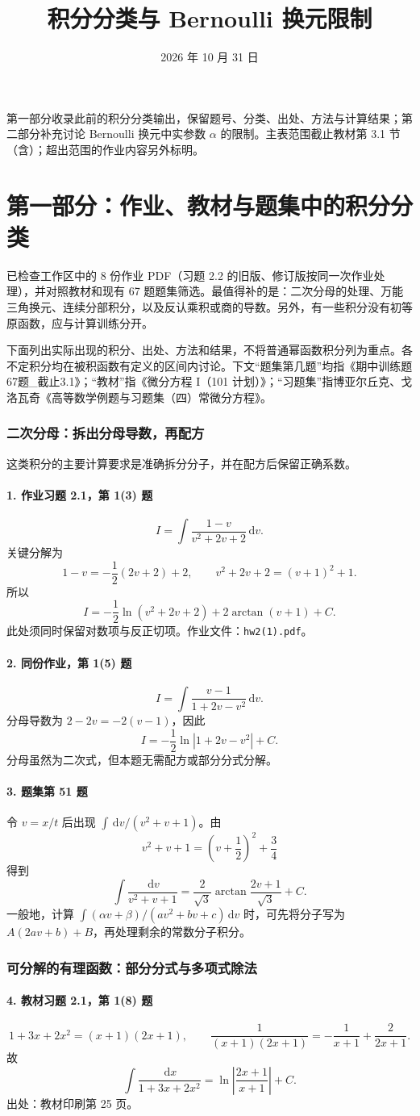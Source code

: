 \documentclass[11pt,a4paper]{ctexart}
\newcommand{\dd}{\,\mathrm d}
\newcommand{\entry}[1]{\subsection*{#1}}
\begin{document}
\title{积分分类与 Bernoulli 换元限制}
\author{}\date{2026 年 10 月 31 日}
\maketitle
第一部分收录此前的积分分类输出，保留题号、分类、出处、方法与计算结果；第二部分补充讨论 Bernoulli 换元中实参数 $\alpha$ 的限制。主表范围截止教材第 3.1 节（含）；超出范围的作业内容另外标明。

\part*{第一部分：作业、教材与题集中的积分分类}
已检查工作区中的 8 份作业 PDF（习题 2.2 的旧版、修订版按同一次作业处理），并对照教材和现有 67 题题集筛选。最值得补的是：二次分母的处理、万能三角换元、连续分部积分，以及反认乘积或商的导数。另外，有一些积分没有初等原函数，应与计算训练分开。

下面列出实际出现的积分、出处、方法和结果，不将普通幂函数积分列为重点。各不定积分均在被积函数有定义的区间内讨论。下文“题集第几题”均指《期中训练题67题\_截止3.1》；“教材”指《微分方程 I（101 计划）》；“习题集”指博亚尔丘克、戈洛瓦奇《高等数学例题与习题集（四）常微分方程》。

\section{二次分母：拆出分母导数，再配方}
这类积分的主要计算要求是准确拆分分子，并在配方后保留正确系数。

\entry{1. 作业习题 2.1，第 1(3) 题}
\[
I=\int\frac{1-v}{v^2+2v+2}\dd v.
\]
关键分解为
\[
1-v=-\frac12(2v+2)+2,\qquad v^2+2v+2=(v+1)^2+1.
\]
所以
\[
\boxed{I=-\frac12\ln(v^2+2v+2)+2\arctan(v+1)+C.}
\]
此处须同时保留对数项与反正切项。作业文件：\texttt{hw2(1).pdf}。

\entry{2. 同份作业，第 1(5) 题}
\[
I=\int\frac{v-1}{1+2v-v^2}\dd v.
\]
分母导数为 $2-2v=-2(v-1)$，因此
\[
\boxed{I=-\frac12\ln|1+2v-v^2|+C.}
\]
分母虽然为二次式，但本题无需配方或部分分式分解。

\entry{3. 题集第 51 题}
令 $v=x/t$ 后出现 $\int\dd v/(v^2+v+1)$。由
\[
v^2+v+1=\left(v+\frac12\right)^2+\frac34
\]
得到
\[
\boxed{\int\frac{\dd v}{v^2+v+1}
=\frac2{\sqrt3}\arctan\frac{2v+1}{\sqrt3}+C.}
\]
一般地，计算 $\int(\alpha v+\beta)/(av^2+bv+c)\dd v$ 时，可先将分子写为 $A(2av+b)+B$，再处理剩余的常数分子积分。

\section{可分解的有理函数：部分分式与多项式除法}
\entry{4. 教材习题 2.1，第 1(8) 题}
\[
1+3x+2x^2=(x+1)(2x+1),\qquad
\frac1{(x+1)(2x+1)}=-\frac1{x+1}+\frac2{2x+1}.
\]
故
\[
\boxed{\int\frac{\dd x}{1+3x+2x^2}
=\ln\left|\frac{2x+1}{x+1}\right|+C.}
\]
出处：教材印刷第 25 页。
\end{document}
